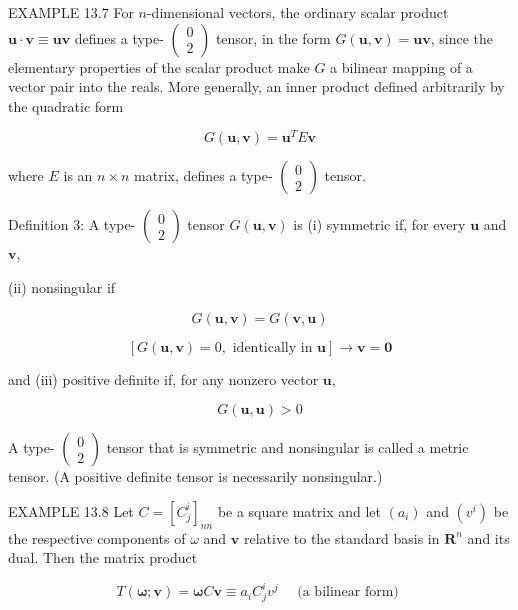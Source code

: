 \documentclass[10pt]{article}
\begin{document}
EXAMPLE 13.7 For $n$-dimensional vectors, the ordinary scalar product $\mathbf{u} \cdot \mathbf{v} \equiv \mathbf{u v}$ defines a type- $\left(\begin{array}{l}0 \\ 2\end{array}\right)$ tensor, in the form $G(\mathbf{u}, \mathbf{v})=\mathbf{u v}$, since the elementary properties of the scalar product make $G$ a bilinear mapping of a vector pair into the reals. More generally, an inner product defined arbitrarily by the quadratic form

$$
G(\mathbf{u}, \mathbf{v})=\mathbf{u}^{T} E \mathbf{v}
$$

where $E$ is an $n \times n$ matrix, defines a type- $\left(\begin{array}{l}0 \\ 2\end{array}\right)$ tensor.

Definition 3: A type- $\left(\begin{array}{l}0 \\ 2\end{array}\right)$ tensor $G(\mathbf{u}, \mathbf{v})$ is (i) symmetric if, for every $\mathbf{u}$ and $\mathbf{v}$,

(ii) nonsingular if

$$
G(\mathbf{u}, \mathbf{v})=G(\mathbf{v}, \mathbf{u})
$$

$$
[G(\mathbf{u}, \mathbf{v})=0, \text { identically in } \mathbf{u}] \rightarrow \mathbf{v}=\mathbf{0}
$$

and (iii) positive definite if, for any nonzero vector $\mathbf{u}$,

$$
G(\mathbf{u}, \mathbf{u})>0
$$

A type- $\left(\begin{array}{l}0 \\ 2\end{array}\right)$ tensor that is symmetric and nonsingular is called a metric tensor. (A positive definite tensor is necessarily nonsingular.)

EXAMPLE 13.8 Let $C=\left[C_{j}^{i}\right]_{n n}$ be a square matrix and let $\left(a_{i}\right)$ and $\left(v^{i}\right)$ be the respective components of $\omega$ and $\mathbf{v}$ relative to the standard basis in $\mathbf{R}^{n}$ and its dual. Then the matrix product

$$
T(\boldsymbol{\omega} ; \mathbf{v})=\boldsymbol{\omega} C \mathbf{v} \equiv a_{i} C_{j}^{i} v^{j} \quad \text { (a bilinear form) }
$$
\end{document}
